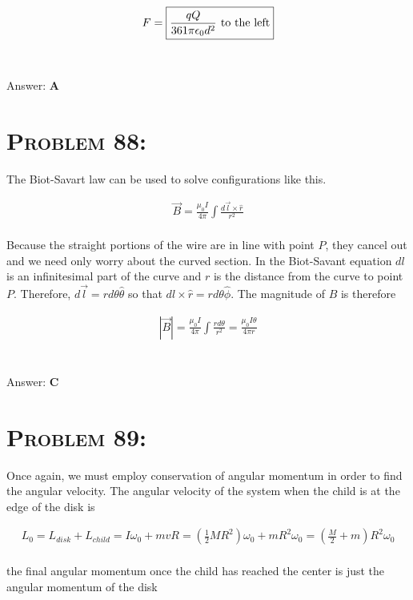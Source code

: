 \documentclass{article}
\begin{document}
\begin{gather}
F =  \boxed{\frac{q Q}{361 \pi \epsilon_{0}  d^{2}} \hspace{.05in} \text{to the left}}\nonumber
\end{gather}
\\\\
Answer: \textbf{\textcolor{ProcessBlue}A}\\


\section{\textsc{Problem 88:}} The Biot-Savart law can be used to solve configurations like this.

\begin{gather}
\vec{B} = \frac{\mu_{0} I}{4 \pi} \int{\frac {d\vec{l} \times \hat{r}} {r^{2}}}
\end{gather}
\\
Because the straight portions of the wire are in line with point $P$, they cancel out and we need only worry about the curved section. In the Biot-Savant equation $dl$ is an infinitesimal part of the curve and $r$ is the distance from the curve to point $P$. Therefore, $d\vec{l} = r d\theta \hat{\theta}$ so that $dl \times \hat{r}= r d\theta \hat{\phi}$. The magnitude of $B$ is therefore

\begin{gather}
|\vec{B} | = \frac{\mu_{0} I}{4 \pi} \int{\frac {rd\theta} {r^{2}} } = \frac{\mu_{0} I  \theta}{4 \pi r}\nonumber
\end{gather}
\\\\
Answer: \textbf{\textcolor{ProcessBlue}C}\\


\section{\textsc{Problem 89:}} Once again, we must employ conservation of angular momentum in order to find the angular velocity. The angular velocity of the system when the child is at the edge of the disk is

\begin{gather}
L_{0} = L_{disk} + L_{child} = I \omega_{0} + mvR = \left(  \frac{1}{2} M R^{2} \right)\omega_{0} + mR^{2} \omega_{0} = \left(   \frac{M}{2} + m \right) R^{2}  \omega_{0}   \nonumber
\end{gather}
\\
the final angular momentum once the child has reached the center is just the angular momentum of the disk
\end{document}
